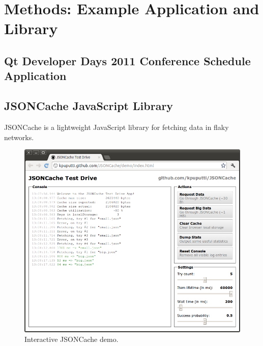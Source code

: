 \chapter{Methods: Example Application and Library}
\label{chapter:methods}

\section{Qt Developer Days 2011 Conference Schedule Application}
\label{section:devdays}

\section{JSONCache JavaScript Library}
\label{section:jsoncache}

JSONCache is a lightweight JavaScript library for fetching 
data in flaky networks.

\begin{figure}[ht]
  \begin{center}
    \includegraphics[width=\textwidth]{images/jsoncache-demo.png}
    \caption{Interactive JSONCache demo.}
    \label{figure:jsoncache-demo.png}
  \end{center}
\end{figure}
